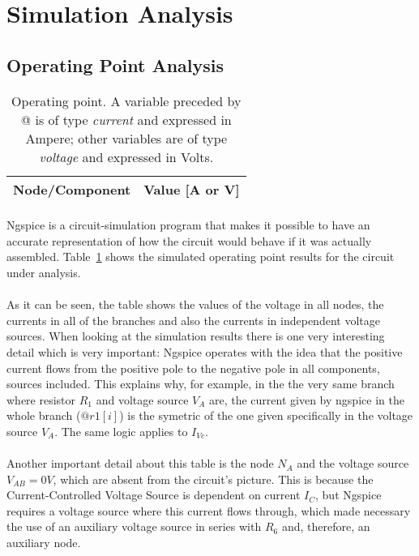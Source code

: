 \section{Simulation Analysis}
\label{sec:simulation}

\subsection{Operating Point Analysis}
\label{subsec:opa}

\begin{table}[h] \centering
  \begin{tabular}{|l|r|}
    \hline    
    {\bf Node/Component} & {\bf Value [A or V]} \\ \hline
    
  \end{tabular}
  \caption{Operating point. A variable preceded by @ is of type {\em current}
    and expressed in Ampere; other variables are of type {\it voltage} and expressed in
    Volts.}
  \label{tab:op}
\end{table}



\paragraph{}Ngspice is a circuit-simulation program that makes it possible to have an accurate representation of how the circuit would behave if it was actually assembled. Table~\ref{tab:op} shows the simulated operating point results for the circuit
under analysis.


\paragraph{}As it can be seen, the table shows the values of the voltage in all nodes, the currents in all of the branches and also the currents in independent voltage sources. When looking at the simulation results there is one very interesting detail which is very important: Ngspice operates with the idea that the positive current flows from the positive pole to the negative pole in all components, sources included. This explains why, for example, in the the very same branch where resistor $R_1$ and voltage source $V_A$ are, the current given by ngspice in the whole branch ($@r1[i]$) is the symetric of the one given specifically in the voltage source $V_A$. The same logic applies to $I_{Vc}$. 
\paragraph{} Another important detail about this table is the node $N_A$ and the voltage source $V_{AB} = 0 V$, which are absent from the circuit's picture. This is because the Current-Controlled Voltage Source is dependent on current $I_C$, but Ngspice requires a voltage source where this current flows through, which made necessary the use of an auxiliary voltage source in series with $R_6$ and, therefore, an auxiliary node.  




